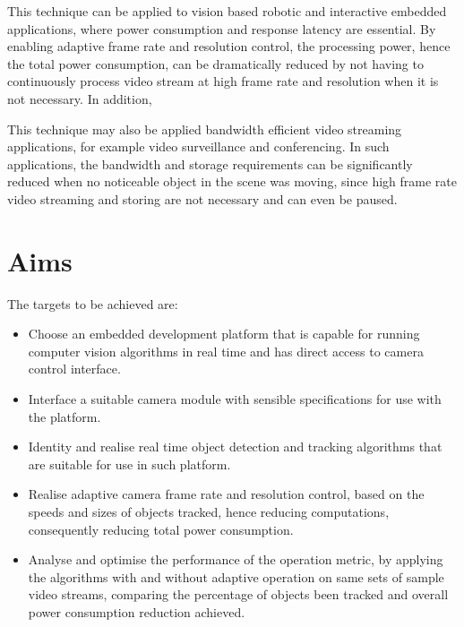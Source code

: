 \iffalse
Example applications, can be multiple.
e.g. Video conference.
\fi

This technique can be applied to vision based robotic and interactive embedded applications, where power consumption and response latency are essential. By enabling adaptive frame rate and resolution control, the processing power, hence the total power consumption, can be dramatically reduced by not having to continuously process video stream at high frame rate and resolution when it is not necessary. In addition, 

This technique may also be applied  bandwidth efficient video streaming applications, for example video surveillance and conferencing. In such applications, the bandwidth and storage requirements can be significantly reduced when no noticeable object in the scene was moving, since high frame rate video streaming and storing are not necessary and can even be paused.

\section{Aims}

\iffalse
Metric: power consumption vs accuracy?
What have done?
\fi

\iffalse
The aim of this project was to investigate ways to reduce overall power consumption of camera based real-time object detection and tracking applications, by applying feedback control of the camera module based on previous tracking results and utilising existing camera hardware capabilities including down sampling and cropping instead of software algorithms, while keeping a sensible accuracy. By doing so the average computation time would be dramatically reduced, hence reducing the overall power consumption.
\fi

The targets to be achieved are:

\begin{itemize}
	\item Choose an embedded development platform that is capable for running computer vision algorithms in real time and has direct access to camera control interface.
	\item Interface a suitable camera module with sensible specifications for use with the platform.
	\item Identity and realise real time object detection and tracking algorithms that are suitable for use in such platform.
	\item Realise adaptive camera frame rate and resolution control, based on the speeds and sizes of objects tracked, hence reducing computations, consequently reducing total power consumption.
	\item Analyse and optimise the performance of the operation metric, by applying the algorithms with and without adaptive operation on same sets of sample video streams, comparing the percentage of objects been tracked and overall power consumption reduction achieved.
\end{itemize}

